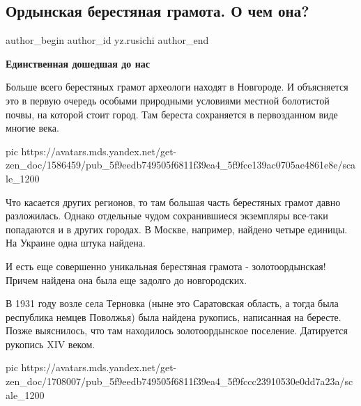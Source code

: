  
 
 
 
 
 
\subsection{Ордынская берестяная грамота. О чем она?}
\label{sec:05_11_2020.sites.ru.zen_yandex.yz.rusichi.1.orda_berestjanaja_gramota}
\ifcmt
	author_begin
   author_id yz.rusichi
	author_end
\fi


\textbf{Единственная дошедшая до нас}

Больше всего берестяных грамот археологи находят в Новгороде. И объясняется это
в первую очередь особыми природными условиями местной болотистой почвы, на
которой стоит город. Там береста сохраняется в первозданном виде многие века.

\ifcmt
  pic https://avatars.mds.yandex.net/get-zen_doc/1586459/pub_5f9eedb749505f6811f39ea4_5f9fce139ac0705ae4861e8e/scale_1200
\fi

Что касается других регионов, то там большая часть берестяных грамот давно
разложилась. Однако отдельные чудом сохранившиеся экземпляры все-таки
попадаются и в других городах. В Москве, например, найдено четыре единицы. На
Украине одна штука найдена.

И есть еще совершенно уникальная берестяная грамота - золотоордынская! Причем
найдена она была еще задолго до новгородских.

В 1931 году возле села Терновка (ныне это Саратовская область, а тогда была
республика немцев Поволжья) была найдена рукопись, написанная на бересте. Позже
выяснилось, что там находилось золотоордынское поселение. Датируется рукопись
XIV веком.

\ifcmt
  pic https://avatars.mds.yandex.net/get-zen_doc/1708007/pub_5f9eedb749505f6811f39ea4_5f9fccc23910530e0dd7a23a/scale_1200
\fi

